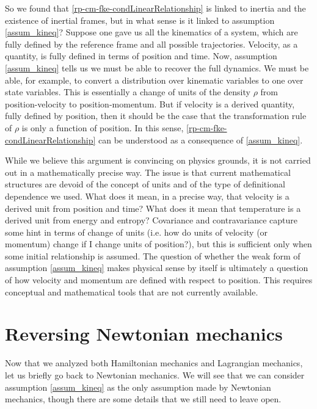 So we found that \ref{rp-cm-fke-condLinearRelationship} is linked to inertia and the existence of inertial frames, but in what sense is it linked to assumption \ref{assum_kineq}? Suppose one gave us all the kinematics of a system, which are fully defined by the reference frame and all possible trajectories. Velocity, as a quantity, is fully defined in terms of position and time. Now, assumption \ref{assum_kineq} tells us we must be able to recover the full dynamics. We must be able, for example, to convert a distribution over kinematic variables to one over state variables. This is essentially a change of units of the density $\rho$ from position-velocity to position-momentum. But if velocity is a derived quantity, fully defined by position, then it should be the case that the transformation rule of $\rho$ is only a function of position. In this sense, \ref{rp-cm-fke-condLinearRelationship} can be understood as a consequence of \ref{assum_kineq}.

While we believe this argument is convincing on physics grounds, it is not carried out in a mathematically precise way. The issue is that current mathematical structures are devoid of the concept of units and of the type of definitional dependence we used. What does it mean, in a precise way, that velocity is a derived unit from position and time? What does it mean that temperature is a derived unit from energy and entropy? Covariance and contravariance capture some hint in terms of change of units (i.e. how do units of velocity (or momentum) change if I change units of position?), but this is sufficient only when some initial relationship is assumed. The question of whether the weak form of assumption \ref{assum_kineq} makes physical sense by itself is ultimately a question of how velocity and momentum are defined with respect to position. This requires conceptual and mathematical tools that are not currently available.


\section{Reversing Newtonian mechanics}

Now that we analyzed both Hamiltonian mechanics and Lagrangian mechanics, let us briefly go back to Newtonian mechanics. We will see that we can consider assumption \ref{assum_kineq} as the only assumption made by Newtonian mechanics, though there are some details that we still need to leave open.

